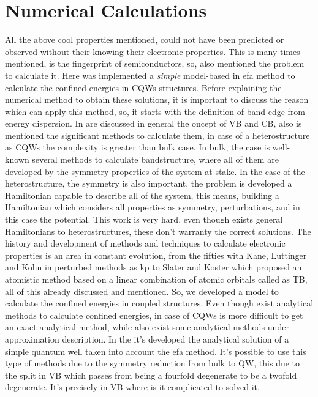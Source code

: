 \section{Numerical Calculations}
\label{sec:chapter-2-numerical-calculations}
\vspace{-10mm} 
All the above cool properties mentioned, could not have been predicted or observed without their knowing their electronic properties. This is many times mentioned, is the fingerprint of semiconductors, so, also mentioned the problem to calculate it. Here was implemented a \emph{simple} model-based in \gls{efa} method to calculate the confined energies in \gls{CQWs} structures. Before explaining the numerical method to obtain these solutions, it is important to discuss the reason which can apply this method, so, it starts with the definition of band-edge from energy dispersion. In  are discussed in general the oncept of \gls{VB} and \gls{CB}, also is mentioned the significant methods to calculate them, in case of a heterostructure as \gls{CQWs} the complexity is greater than bulk case. In bulk, the case is well-known several methods to calculate bandstructure, where all of them are developed by the symmetry properties of the system at stake. In the case of the heterostructure, the symmetry is also important, the problem is developed a Hamiltonian capable to describe all of the system, this means, building a Hamiltonian which considers all properties as symmetry, perturbations, and in this case the potential. This work is very hard, even though exists general Hamiltonians to heterostructures, these don't warranty the correct solutions. The history and development of methods and techniques to calculate electronic properties is an area in constant evolution, from the fifties with Kane\cite{kane1957bandstructure}, Luttinger and Kohn\cite{Luttinger1955motion} in perturbed methods as \gls{kp} to Slater and Koster\cite{slater1954simplified} which proposed an atomistic method based on a linear combination of atomic orbitals called as \gls{TB}, all of this already discussed and mentioned. So, we developed a model to calculate the confined energies in coupled structures. Even though exist analytical methods to calculate confined energies, in case of CQWs is more difficult to get an exact analytical method, while also exist some analytical methods under approximation description\cite{yariv1985approximate,fromherz1997floquet,rosencher2002optoelectronics}. In the  it's developed the analytical solution of a simple quantum well taken into account the \gls{efa} method. It's possible to use this type of methods due to the symmetry reduction from bulk to QW, this due to the split in \gls{VB} which passes from being a fourfold degenerate to be a twofold degenerate. It's precisely in \gls{VB} where is it complicated to solved it. 


